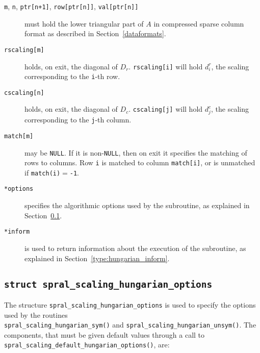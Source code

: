 \begin{description}

\item[\texttt{m}, \texttt{n}, \texttt{ptr[n+1]}, \texttt{row[ptr[n]]}, \texttt{val[ptr[n]]}] must hold the lower triangular part of $A$ in compressed sparse column format as described in Section~\ref{dataformats}.

\item[\texttt{rscaling[m]}] holds, on exit, the diagonal of $D_r$.
\texttt{rscaling[i]} will hold $d^r_i$, the scaling corresponding to the
\texttt{i}-th row.

\item[\texttt{cscaling[n]}] holds, on exit, the diagonal of $D_c$.
\texttt{cscaling[j]} will hold $d^c_j$, the scaling corresponding to the
\texttt{j}-th column.

\item[\texttt{match[m]}] may be \texttt{NULL}. If it is non-\texttt{NULL},
then on exit it specifies the matching of rows to columns.
Row \texttt{i} is matched to column \texttt{match[i]}, or is unmatched
if \texttt{match(i)}$=$\texttt{-1}.

\item[\texttt{*options}] specifies the algorithmic options used by the subroutine, as explained in Section~\ref{type:hungarian_options}.

\item[\texttt{*inform}] is used to return information about the execution of the subroutine, as explained in Section~\ref{type:hungarian_inform}.


\end{description}

\subsection{\texttt{struct spral\_scaling\_hungarian\_options}} \label{type:hungarian_options}

The structure \texttt{spral\_scaling\_hungarian\_options} is used to specify the
options used by the routines \\\texttt{spral\_scaling\_hungarian\_sym()} and \texttt{spral\_scaling\_hungarian\_unsym()}. The components,
that must be given default values through a call to \texttt{spral\_scaling\_default\_hungarian\_options()}, are:

